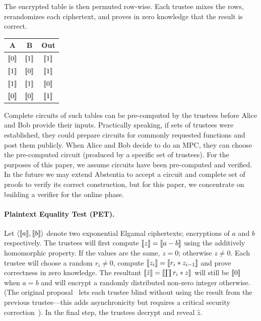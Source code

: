 The encrypted table is then permuted row-wise. Each trustee mixes the rows, rerandomizes each ciphertext, and proves in zero knowledge that the result is correct. 

\begin{center}
\begin{tabular}{|c|c|c|}
  \hline
  A			& 	B			& 	Out   			\\ \hline
  $\llbracket 0 \rrbracket$ 	&	$\llbracket 1 \rrbracket$ 	& 	$\llbracket 1 \rrbracket$ 	\\ \hline
  $\llbracket 1 \rrbracket$ 	&	$\llbracket 0 \rrbracket$ 	&  	$\llbracket 1 \rrbracket$ 	\\ \hline
  $\llbracket 1 \rrbracket$ 	&	$\llbracket 1 \rrbracket$ 	&  	$\llbracket 0 \rrbracket$ 	\\ \hline
  $\llbracket 0 \rrbracket$ 	&	$\llbracket 0 \rrbracket$ 	& 	$\llbracket 1 \rrbracket$ 	\\ \hline
\end{tabular}
\end{center}

Complete circuits of such tables can be pre-computed by the trustees before Alice and Bob provide their inputs. Practically speaking, if sets of trustees were established, they could prepare circuits for commonly requested functions and post them publicly. When Alice and Bob decide to do an MPC, they can choose the pre-computed circuit (produced by a specific set of trustees). For the purposes of this paper, we assume circuits have been pre-computed and verified. In the future we may extend Abstentia to accept a circuit and complete set of proofs to verify its correct construction, but for this paper, we concentrate on building a verifier for the online phase.

\paragraph{Plaintext Equality Test (PET).} Let $\left \langle \llbracket a \rrbracket,\llbracket b \rrbracket \right \rangle$ denote two exponential Elgamal ciphertexts; encryptions of $a$ and $b$ respectively. The trustees will first compute $\llbracket z \rrbracket=\llbracket a-b \rrbracket$ using the additively homomorphic property. If the values are the same, $z=0$; otherwise $z\neq 0$. Each trustee will choose a random $r_i\neq0$, compute $\llbracket z_i \rrbracket=\llbracket r_i*z_{i-1} \rrbracket$ and prove correctness in zero knowledge. The resultant $\llbracket \hat{z} \rrbracket=\llbracket \prod r_i*z \rrbracket$ will still be $\llbracket 0 \rrbracket$ when $a=b$ and will encrypt a randomly distributed non-zero integer otherwise. (The original proposal~\cite{JJ00} lets each trustee blind without using the result from the previous trustee---this adds asynchronicity but requires a critical security correction~\cite{mcmurtry2020test}). In the final step, the trustees decrypt and reveal $\hat{z}$.

